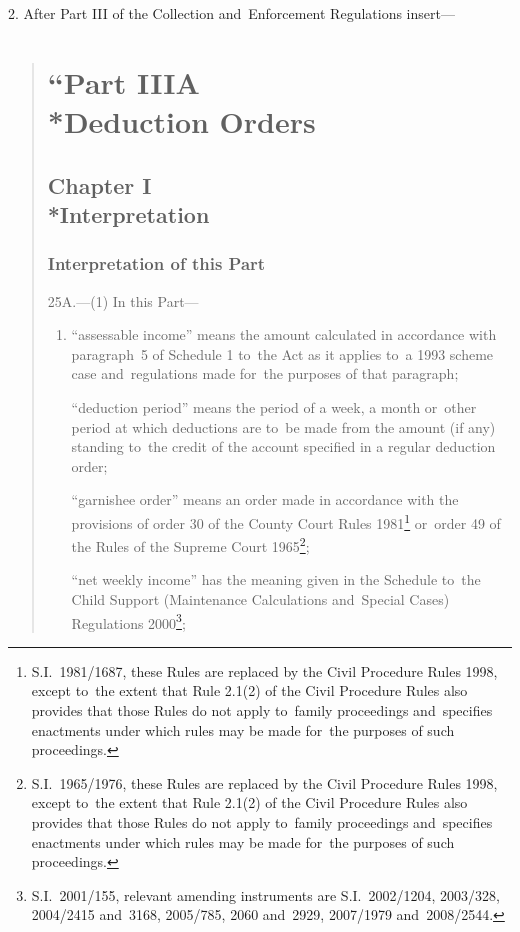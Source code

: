 \documentclass[12pt,a4paper]{article}
\begin{document}
2.  After Part III of the Collection and~Enforcement Regulations insert—
\begin{quotation}
\section*{“Part IIIA\\*Deduction Orders}

\subsection*{Chapter I\\*Interpretation}

\subsubsection*{Interpretation of this Part}

25A.---(1)  In this Part—
\begin{enumerate}\item[]
“assessable income” means the amount calculated in accordance with paragraph~5 of Schedule 1 to~the Act as it applies to~a 1993 scheme case and~regulations made for~the purposes of that paragraph;

“deduction period” means the period of a week, a month or~other period at which deductions are to~be made from the amount (if any) standing to~the credit of the account specified in a regular deduction order;

“garnishee order” means an order made in accordance with the provisions of order 30 of the County Court Rules 1981\footnote{S.I.~1981/1687, these Rules are replaced by the Civil Procedure Rules 1998, except to~the extent that Rule 2.1(2) of the Civil Procedure Rules also provides that those Rules do not apply to~family proceedings and~specifies enactments under which rules may be made for~the purposes of such proceedings.} or~order 49 of the Rules of the Supreme Court 1965\footnote{S.I.~1965/1976, these Rules are replaced by the Civil Procedure Rules 1998, except to~the extent that Rule 2.1(2) of the Civil Procedure Rules also provides that those Rules do not apply to~family proceedings and~specifies enactments under which rules may be made for~the purposes of such proceedings.};

“net weekly income” has the meaning given in the Schedule to~the Child Support (Maintenance Calculations and~Special Cases) Regulations 2000\footnote{S.I.~2001/155, relevant amending instruments are S.I.~2002/1204, 2003/328, 2004/2415 and~3168, 2005/785, 2060 and~2929, 2007/1979 and~2008/2544.};


\end{enumerate}
\end{quotation}
\end{document}
